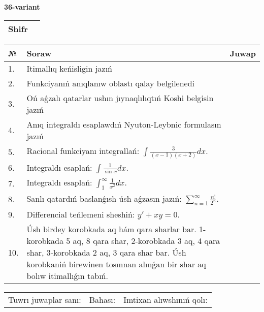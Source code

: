 \documentclass{article}
\begin{document}
  \egroup
  
  \newpage
  
  
  \textbf{36-variant}\\
  
  \bgroup
  \def\arraystretch{1.6} %
  
  \begin{tabular}{|m{5.7cm}|m{9.5cm}|}
  \hline
  Shifr & \\
  \hline
  \end{tabular}
  
  \vspace{1cm}
  
  \begin{tabular}{|m{0.7cm}|m{10cm}|m{4cm}|}
  \hline
  № & Soraw & Juwap \\
  \hline
  1. & Itimallıq keńisligin jazıń &  \\
  \hline
  2. & Funkciyanıń anıqlanıw oblastı qalay belgilenedi &  \\
  \hline
  3. & Oń aǵzalı qatarlar ushın jıynaqlılıqtıń Koshi belgisin jazıń &  \\
  \hline
  4. & Anıq integraldı esaplawdıń Nyuton-Leybnic formulasın jazıń &  \\
  \hline
  5. & Racional funkciyanı integrallań: \(\int{\frac{3}{(x - 1)(x + 2)}dx}\). &  \\
  \hline
  6. & Integraldı esaplań: \(\int{\frac{1}{\sin x}dx}\). &  \\
  \hline
  7. & Integraldı esaplań: \(\int_{1}^{\infty}{\frac{1}{x^2 }dx}\). &  \\
  \hline
  8. & Sanlı qatardıń baslanǵısh úsh aǵzasın jazıń: \(\sum_{n = 1}^{\infty}\frac{n!}{2^{n}}\). &  \\
  \hline
  9. & Differencial teńlemeni sheshiń: \(y' + xy = 0\). &  \\
  \hline
  10. & Úsh birdey korobkada aq hám qara sharlar bar. 1-korobkada 5 aq, 8 qara shar, 2-korobkada 3 aq, 4 qara shar, 3-korobkada 2 aq, 3 qara shar bar. Úsh korobkaniń birewinen tosınnan alınǵan bir shar aq bolıw itimallıǵın tabıń. &  \\
  \hline
  \end{tabular}
  
  \vspace{1cm}
  
  \begin{tabular}{lll}
  Tuwrı juwaplar sanı: \underline{\hspace{1.5cm}} & 
  Bahası: \underline{\hspace{1.5cm}} & 
  Imtixan alıwshınıń qolı: \underline{\hspace{2cm}} \\
  \end{tabular}
  
\end{document}

